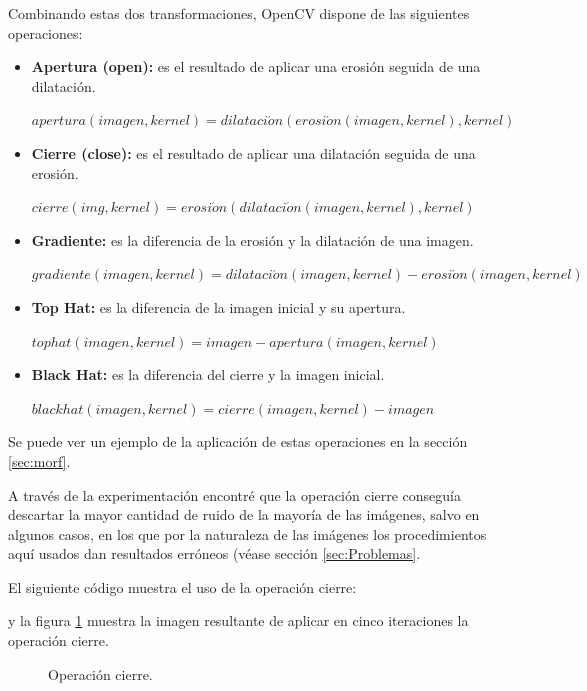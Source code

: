 \documentclass[a4paper,12pt]{article}
\begin{document}
Combinando estas dos transformaciones, OpenCV dispone de las siguientes operaciones:
\begin{itemize}
\item \textbf{Apertura (open): } es el resultado de aplicar una erosión seguida de una dilatación.
\begin{center}
$apertura(imagen, kernel) = dilataci\acute{o}n(erosi\acute{o}n(imagen,kernel), kernel)$
\end{center}
\item \textbf{Cierre (close):} es el resultado de aplicar una dilatación seguida de una erosión.
\begin{center}
$cierre(img, kernel) = erosi\acute{o}n(dilataci\acute{o}n(imagen,kernel),kernel)$
\end{center}
\item \textbf{Gradiente:} es la diferencia de la erosión y la dilatación de una imagen.
\begin{center}
$gradiente(imagen, kernel) = dilataci\acute{o}n(imagen,kernel) - erosi\acute{o}n(imagen,kernel)$
\end{center}
\item \textbf{Top Hat:} es la diferencia de la imagen inicial y su apertura.
\begin{center}
$tophat(imagen, kernel) = imagen - apertura(imagen, kernel)$
\end{center}
\item \textbf{Black Hat:} es la diferencia del cierre y la imagen inicial.
\begin{center}
$blackhat(imagen, kernel) = cierre(imagen, kernel)- imagen$
\end{center}
\end{itemize}

Se puede ver un ejemplo de la aplicación de estas operaciones en la sección \ref{sec:morf}.

A través de la experimentación encontré que la operación cierre conseguía descartar la mayor cantidad de ruido de la mayoría de las imágenes, salvo en algunos casos, en los que por la naturaleza de las imágenes los procedimientos aquí usados dan resultados erróneos (véase sección \ref{sec:Problemas}.

El siguiente código muestra el uso de la operación cierre:

y la figura \ref{fig:img4} muestra la imagen resultante de aplicar en cinco iteraciones la operación cierre.
\begin{figure}[h!]
\centering
{}
\caption{Operación cierre.}
\label{fig:img4}
\end{figure}
\end{document}
